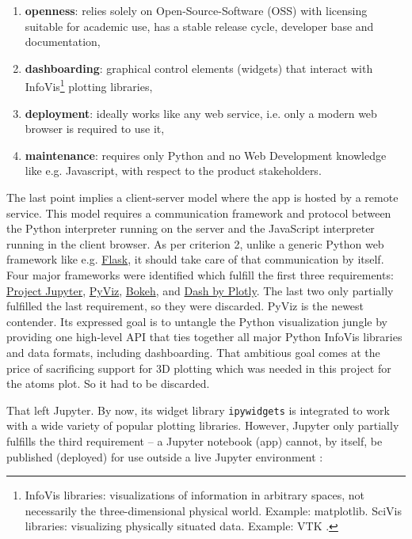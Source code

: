 \begin{enumerate}
\item \textbf{openness}: relies solely on Open-Source-Software (OSS) with
    licensing suitable for academic use, has a stable release cycle, developer
    base and documentation,
\item \textbf{dashboarding}: graphical control elements (widgets) that interact
    with InfoVis\footnote{InfoVis libraries: visualizations of information in
      arbitrary spaces, not necessarily the three-dimensional physical world.
      Example: matplotlib. SciVis libraries: visualizing physically situated
      data. Example: VTK \cite{python-viz-2018}.} plotting libraries,
\item \textbf{deployment}: ideally works like any web service, i.e. only a
    modern web browser is required to use it,
\item \textbf{maintenance}: requires only Python and no Web Development
    knowledge like e.g. Javascript, with respect to the product stakeholders.
\end{enumerate}

The last point implies a client-server model where the app is hosted by a remote
service. This model requires a communication framework and protocol between the
Python interpreter running on the server and the JavaScript interpreter running
in the client browser. As per criterion 2, unlike a generic Python web framework
like e.g. \href{http://flask.pocoo.org/}{Flask}, it should take care of that
communication by itself. Four major frameworks were identified which fulfill the
first three requirements: \href{https://jupyter.org/}{Project Jupyter},
\href{http://pyviz.org/}{PyViz},
\href{https://bokeh.pydata.org/en/latest/}{Bokeh}, and
\href{https://plot.ly/products/dash/}{Dash by Plotly}. The last two only
partially fulfilled the last requirement, so they were discarded. PyViz is the
newest contender. Its expressed goal is to untangle the Python visualization
jungle by providing one high-level API that ties together all major Python
InfoVis libraries and data formats, including dashboarding. That ambitious goal
comes at the price of sacrificing support for 3D plotting \cite{pyviz-faq} which
was needed in this project for the atoms plot. So it had to be discarded.

That left Jupyter. By now, its widget library \texttt{ipywidgets} is integrated
to work with a wide variety of popular plotting libraries. However, Jupyter only
partially fulfills the third requirement -- a Jupyter notebook (app) cannot, by
itself, be published (deployed) for use outside a live Jupyter environment
\cite{python-viz-2018}:

